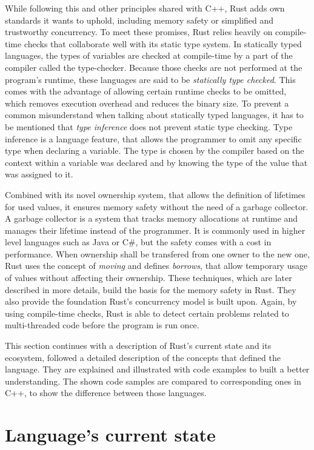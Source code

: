 While following this and other principles shared with C++, Rust adds own standards it wants to uphold, including memory safety or simplified and trustworthy concurrency. To meet these promises, Rust relies heavily on compile-time checks that collaborate well with its static type system. 
In statically typed languages, the types of variables are checked at compile-time by a part of the compiler called the type-checker. Because those checks are not performed at the program's runtime, these languages are said to be \textit{statically type checked}. This comes with the advantage of allowing certain runtime checks to be omitted, which removes execution overhead and reduces the binary size. To prevent a common misunderstand when talking about statically typed languages, it has to be mentioned that \textit{type inference} does not prevent static type checking. Type inference is a language feature, that allows the programmer to omit any specific type when declaring a variable. The type is chosen by the compiler based on the context within a variable was declared and by knowing the type of the value that was assigned to it. 

Combined with its novel ownership system, that allows the definition of lifetimes for used values, it ensures memory safety without the need of a garbage collector. A garbage collector is a system that tracks memory allocations at runtime and manages their lifetime instead of the programmer. It is commonly used in higher level languages such as Java or C\#, but the safety comes with a cost in performance. When ownership shall be transfered from one owner to the new one, Rust uses the concept of \textit{moving} and defines \textit{borrows}, that allow temporary usage of values without affecting their ownership. These techniques, which are later described in more details, build the basis for the memory safety in Rust. They also provide the foundation Rust's concurrency model is built upon. Again, by using compile-time checks, Rust is able to detect certain problems related to multi-threaded code before the program is run once. 

This section continues with a description of Rust's current state and its ecosystem, followed a detailed description of the concepts that defined the language. They are explained and illustrated with code examples to built a better understanding. The shown code samples are compared to corresponding ones in C++, to show the difference between those languages.

\section{Language's current state}

